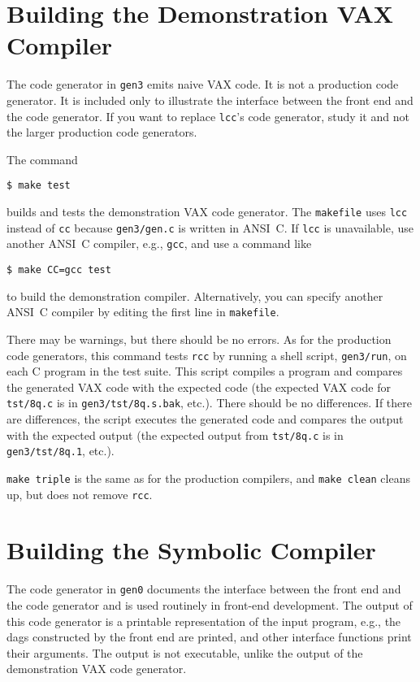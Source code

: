 \section{Building the Demonstration VAX Compiler}

The code generator in \verb|gen3| emits naive VAX code.
It is not a production code generator. It is included only
to illustrate the interface between the front end
and the code generator. If you want to replace \verb|lcc|'s code generator,
study it and not the larger production code generators.

The command
\begin{verbatim}
$ make test
\end{verbatim}
builds and tests the demonstration VAX code generator.
The \verb|makefile| uses \verb|lcc| instead of \verb|cc|
because \verb|gen3/gen.c| is written in ANSI~C.
If \verb|lcc| is unavailable, use another ANSI~C compiler, e.g., \verb|gcc|,
and use a command like
\begin{verbatim}
$ make CC=gcc test
\end{verbatim}
to build the demonstration compiler. Alternatively, you can specify
another ANSI~C compiler by editing the first line in \verb|makefile|.

There may be warnings, but there should be no errors.
As for the production code generators, this command
tests \verb|rcc| by running a shell script,
\verb|gen3/run|, on each C program in the test suite.
This script compiles a program and compares the generated VAX code
with the expected code (the expected VAX code for \verb|tst/8q.c| is
in \verb|gen3/tst/8q.s.bak|, etc.). There should be no differences.
If there are differences, the script executes the generated code
and compares the output with the expected output
(the expected output from \verb|tst/8q.c| is
in \verb|gen3/tst/8q.1|, etc.).

\verb|make triple| is the same as for the production compilers, and
\verb|make clean| cleans up, but does not remove \verb|rcc|.


\section{Building the Symbolic Compiler}

The code generator in \verb|gen0| documents the
interface between the front end and the code generator and is used routinely in
front-end development. The output of this code generator is a printable
representation of the input program, e.g., the dags constructed by the
front end are printed, and other interface functions print their arguments.
The output is not executable, unlike the output of the demonstration
VAX code generator.

